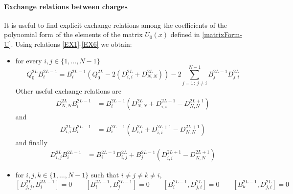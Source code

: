 \documentclass[10pt]{article}
\numberwithin{equation}{section}
\numberwithin{equation}{subsection}
\begin{document}
\paragraph{Exchange relations between charges} It is useful to find explicit exchange relations among the coefficients of the polynomial form of the elements of the matrix $U_{0}(x)$ defined in \eqref{matrixForm-U}. Using relations \eqref{EX1}-\eqref{EX6} we obtain:
\begin{itemize}
	\item 
for every $i,j\in\{1,\ldots,N-1\}$ 
\begin{equation}\label{ExQ0B-charges}
Q_{0}^{2L}B_{i}^{2L-1}=B_{i}^{2L-1}\left(Q_{0}^{2L}-2(D_{i,i}^{2L}+D_{N,N}^{2L})\right)-2\sum_{j=1\,:\,j\neq i}^{N-1}B_{j}^{2L-1}D_{j,i}^{2L}
\end{equation}
Other useful exchange relations are 
\begin{equation}\label{ExDNB-charges}
\begin{split}
D_{N,N}^{2L}B_{i}^{2L-1}&=B_{i}^{2L-1}\left(D_{N,N}^{2L}+D_{i,i}^{2L+1}-D_{N,N}^{2L+1}\right)%
\end{split}
\end{equation}
and
\begin{equation}\label{ExDiB-charges}
\begin{split}
D_{i,i}^{2L}B_{i}^{2L-1}&=B_{i}^{2L-1}\left(D_{i,i}^{2L}+D_{i,i}^{2L+1}-D_{N,N}^{2L+1}\right)%
\end{split}
\end{equation}
and finally
\begin{equation}\label{ExDijB-charges}
\begin{split}
D_{i,j}^{2L}B_{i}^{2L-1}&=B_{i}^{2L-1}D_{i,j}^{2L}+B_{j}^{2L-1}\left(D_{i,i}^{2L+1}-D_{N,N}^{2L+1}\right)%
\end{split}
\end{equation}
\item  for $i,j,k\in\{1,\ldots,N-1\}$ such that $i\neq j\neq k\neq i,$
\begin{equation}\label{Commuting-Charges}
\left[D_{j,j}^{2L},B_{i}^{2L-1}\right]=0\qquad \left[B_{i}^{2L-1},B_{j}^{2L-1}\right]=0\qquad \left[B_{i}^{2L-1},D_{j,i}^{2L}\right]=0\qquad \left[B_{k}^{2L-1},D_{j,i}^{2L}\right]=0%
\end{equation}
\end{itemize} 
\end{document}
